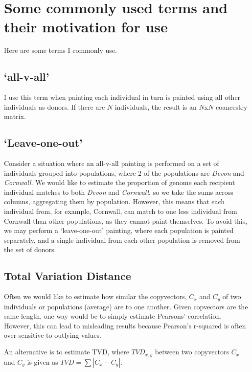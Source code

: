 \chapter{Some commonly used terms and their motivation for use}
\label{appendixlabel2}


Here are some terms I commonly use.

\section{`all-v-all'} \label{sec:allvall}

I use this term when painting each individual in turn is painted using all other individuals as donors. If there are $N$ individuals, the result is an $N$x$N$ coancestry matrix.


\section{`Leave-one-out'} \label{sec:leave_one_out}

Consider a situation where an all-v-all painting is performed on a set of individuals grouped into populations, where 2 of the populations are \textit{Devon} and \textit{Cornwall}. We would like to estimate the proportion of genome each recipient individual matches to both \textit{Devon} and \textit{Cornwall}, so we take the sums across columns, aggregating them by population. However, this means that each individual from, for example, Cornwall, can match to one less individual from Cornwall than other populations, as they cannot paint themselves. To avoid this, we may perform a `leave-one-out' painting, where each population is painted separately, and a single individual from each other population is removed from the set of donors. 

\section{Total Variation Distance} \label{sec:appendixTVD}

Often we would like to estimate how similar the copyvectors, $C_{x}$ and $C_{y}$ of two individuals or populations (average) are to one another. Given copvectors are the same length, one way would be to simply estimate Pearsons' correlation. However, this can lead to misleading results because Pearson's r-squared is often over-sensitive to outlying values.  

An alternative is to estimate TVD, where $TVD_{x,y}$ between two copyvectors $C_{x}$ and $C_{y}$ is given as $TVD = \sum |C_{x} - C_{y}|$. 




